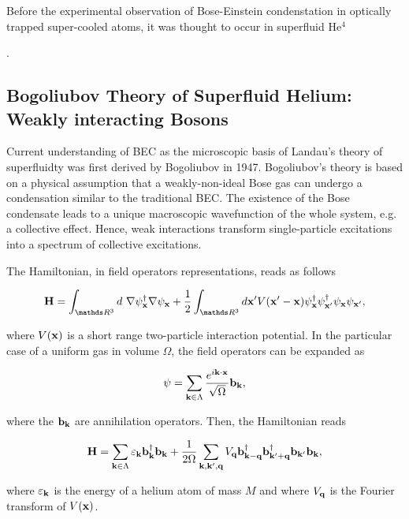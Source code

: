 \blanky \bigbreak 
\begin{tcolorbox}[colback = yellow, title = Physical Context]

Before the experimental observation of Bose-Einstein condenstation in optically trapped super-cooled atoms, it was thought to occur in superfluid He$^4$

\end{tcolorbox}. 


\clearpage

\subsection{Bogoliubov Theory of Superfluid Helium: Weakly interacting Bosons}

Current understanding of BEC as the microscopic basis of Landau's theory of superfluidty was first derived by Bogoliubov in 1947.
Bogoliubov's theory is based on a physical assumption that a weakly-non-ideal Bose gas can undergo a condensation similar to the traditional BEC. 
The existence of the Bose condensate leads to a unique macroscopic wavefunction of the whole system, e.g. a collective effect.
Hence, weak interactions transform single-particle excitations into a spectrum of collective excitations. 

The Hamiltonian, in field operators representations, reads as follows 

\begin{equation}
    {\bf H} = \int_{\R^3} d{\bf } \blanky \nabla \psi^\dagger_{\bf x} \nabla \psi_{\bf x} + \frac{1}{2} \int_{\R^3} d{\bf x'} V({\bf x'-x}) \psi^\dagger_{{\bf x}} \psi^\dagger_{{\bf x'}} \psi_{{\bf x}} \psi_{{\bf x'}},
\end{equation}

where $V(\bf x)$ is a short range two-particle interaction potential. 
In the particular case of a uniform gas in volume ${\Omega}$, the field operators can be expanded as 

\begin{equation}
    \psi = \sum_{{\bf k} \in \Lambda} \frac{e^{i {\bf k} \cdot {\bf x}}}{\sqrt{\Omega}} {\bf b}_{{\bf k}},
\end{equation}

where the ${\bf b}_{{\bf k}}$ are annihilation operators.
Then, the Hamiltonian reads 

\begin{equation}
    {\bf H} = \sum_{{\bf k} \in \Lambda} \varepsilon_{{\bf k}} {\bf b}_{{\bf k}}^\dagger {\bf b}_{{\bf k}} + \frac{1}{2\Omega} \sum_{{\bf k, k',q}} V_{{\bf q}} {\bf b}_{{\bf k-q}}^\dagger {\bf b}_{{\bf k'+q}}^\dagger {\bf b}_{{\bf k}'} {\bf b}_{{\bf k}},
\end{equation}

where $\varepsilon_{{\bf k}}$ is the energy of a helium atom of mass $M$ and where ${V}_{{\bf q}}$ is the Fourier transform of $V({\bf x})$. 


\clearpage
    
